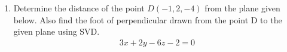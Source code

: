 \renewcommand{\theequation}{\theenumi}
\renewcommand{\thefigure}{\theenumi}
\begin{enumerate}[label=\thesubsection.\arabic*.,ref=\thesubsection.\theenumi]
\item Determine the distance of the point $D(-1, 2, -4)$ from the plane given below. Also find the foot of perpendicular drawn from the point D to the given plane using SVD.
\begin{align}
3x+2y-6z-2=0\label{eq:solutions/4/44/1/d/eq:1.0.1}
\end{align}
%
\solution


\end{enumerate}
